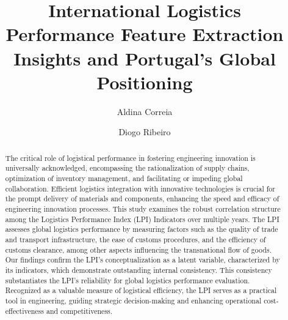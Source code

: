 \documentclass[sigconf]{acmart}
\begin{document}
\title{International Logistics Performance Feature Extraction Insights and Portugal’s Global Positioning}

\author{Aldina Correia}
\authornotemark[1]

\author{Diogo Ribeiro}


\renewcommand{\shortauthors}{Correia et al.}

\begin{abstract}
  The critical role of logistical performance in fostering engineering innovation is universally acknowledged, encompassing the rationalization of supply chains, optimization of inventory management, and facilitating or impeding global collaboration. Efficient logistics integration with innovative technologies is crucial for the prompt delivery of materials and components, enhancing the speed and efficacy of engineering innovation processes. This study examines the robust correlation structure among the Logistics Performance Index (LPI) Indicators over multiple years. The LPI assesses global logistics performance by measuring factors such as the quality of trade and transport infrastructure, the ease of customs procedures, and the efficiency of customs clearance, among other aspects influencing the transnational flow of goods. Our findings confirm the LPI's conceptualization as a latent variable, characterized by its indicators, which demonstrate outstanding internal consistency. This consistency substantiates the LPI's reliability for global logistics performance evaluation. Recognized as a valuable measure of logistical efficiency, the LPI serves as a practical tool in engineering, guiding strategic decision-making and enhancing operational cost-effectiveness and competitiveness.
\end{abstract}
\end{document}
